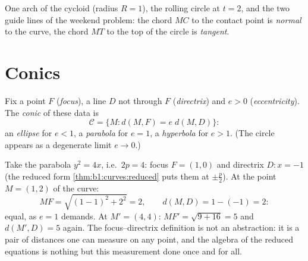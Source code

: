 \begin{omfigure}

{\small One arch of the cycloid (radius $R = 1$), the rolling
circle at $t = 2$, and the two guide lines of the weekend problem:
the chord $MC$ to the contact point is \emph{normal} to the
curve, the chord $MT$ to the top of the circle is \emph{tangent}.}
\end{omfigure}

\section{Conics}

\begin{definition}\label{def:b1:curves:conics}
Fix a point $F$ (\emph{focus}), a line $D$ not through $F$
(\emph{directrix}) and $e > 0$ (\emph{eccentricity}). The
\emph{conic} of these data is
\[
\mathcal{C} = \{M : d(M, F) = e\; d(M, D)\}:
\]
an \emph{ellipse} for $e < 1$, a \emph{parabola} for $e = 1$, a
\emph{hyperbola} for $e > 1$. (The circle appears as a degenerate
limit $e \to 0$.)
\end{definition}

\begin{example}
\label{ex:b1:curves:parabolacheck}
Take the parabola $y^2 = 4x$, i.e.\ $2p = 4$: focus $F = (1, 0)$
and directrix $D : x = -1$ (the reduced form
\cref{thm:b1:curves:reduced} puts them at $\pm\frac p2$). At the
point $M = (1, 2)$ of the curve:
\[
MF = \sqrt{(1-1)^2 + 2^2} = 2,
\qquad
d(M, D) = 1 - (-1) = 2 :
\]
equal, as $e = 1$ demands. At $M' = (4, 4)$: $MF' = \sqrt{9 +
16} = 5$ and $d(M', D) = 5$ again. The focus--directrix
definition is not an abstraction: it is a pair of distances one
can measure on any point, and the algebra of the reduced
equations is nothing but this measurement done once and for
all.
\end{example}

